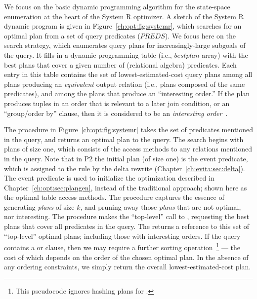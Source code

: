 We focus on the basic dynamic programming algorithm for the state-space
enumeration at the heart of the System R optimizer.  A sketch of the System R
dynamic program is given in Figure~\ref{ch:opt:fig:systemr}, which searches for
an optimal plan from a set of query predicates ($PREDS$).  We focus here on the
search strategy, which enumerates query plans for increasingly-large subgoals
of the query.  It fills in a dynamic programming table (i.e., $bestplan$ array)
with the best plans that cover a given number of (relational algebra)
predicates.  Each entry in this table contains the set of lowest-estimated-cost
query plans among all plans producing an {\em equivalent} output relation
(i.e., plans composed of the same predicates), and among the plans that produce
an ``interesting order.'' If the plan produces tuples in an order that is
relevant to a later join condition, or an ``group/order by'' clause, then it is
considered to be an {\em interesting order}~\cite{selinger}.

The  procedure in Figure~\ref{ch:opt:fig:systemr} takes the set of
predicates mentioned in the query, and returns an optimal plan to the query.
The search begins with plans of size one, which consists of the access methods
to any relations mentioned in the query.  Note that in P2 the initial plan (of
size one) is the event predicate, which is assigned to the rule by the delta
rewrite (Chapter~\ref{ch:evita:sec:delta}).  The event predicate is used to
initialize the optimization described in Chapter~\ref{ch:opt:sec:plangen},
instead of the traditional approach; shown here as the optimal table access
methods.  The  procedure captures the essence of generating {\em
plans} of size $k$, and pruning away those {\em plans} that are not optimal,
nor interesting.  The  procedure makes the ``top-level'' call to
, requesting the best plans that cover all predicates in the query.
The  returns a reference to this set of ``top-level'' optimal plans;
including those with interesting orders.  If the query contains a 
or  clause, then we may require a further sorting
operation~\footnote{This pseudocode ignores hashing plans for .}
--- the cost of which depends on the order of the chosen optimal plan.  In the
absence of any ordering constraints, we simply return the overall
lowest-estimated-cost plan.

